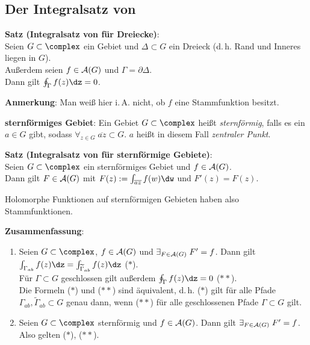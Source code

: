 \subsection{%
    Der Integralsatz von %
}

\textbf{Satz (Integralsatz von  für Dreiecke)}:\\
Seien $G \subset \complex$ ein Gebiet und $\Delta \subset G$ ein Dreieck
(d.\,h. Rand und Inneres liegen in $G$).\\
Außerdem seien $f \in \mathcal{A}(G)$ und $\Gamma = \partial \Delta$.\\
Dann gilt $\oint_\Gamma f(z)\dz = 0$.

\textbf{Anmerkung}:
Man weiß hier i.\,A. nicht, ob $f$ eine Stammfunktion besitzt.

\linie

\textbf{sternförmiges Gebiet}:
Ein Gebiet $G \subset \complex$ heißt \emph{sternförmig}, falls es ein
$a \in G$ gibt, sodass
$\forall_{z \in G}\; \overline{az} \subset G$.
$a$ heißt in diesem Fall \emph{zentraler Punkt}.

\textbf{Satz (Integralsatz von  für sternförmige Gebiete)}:\\
Seien $G \subset \complex$ ein sternförmiges Gebiet und $f \in \mathcal{A}(G)$.\\
Dann gilt $F \in \mathcal{A}(G)$ mit $F(z) := \int_{\overline{az}} f(w)\dw$ und
$F'(z) = F(z)$.

Holomorphe Funktionen auf sternförmigen Gebieten haben also Stammfunktionen.

\linie

\textbf{Zusammenfassung}:
\begin{enumerate}
    \item
    Seien $G \subset \complex$, $f \in \mathcal{A}(G)$ und
    $\exists_{F \in \mathcal{A}(G)}\; F' = f$.
    Dann gilt $\int_{\Gamma_{ab}} f(z)\dz =
    \int_{\widetilde{\Gamma}_{ab}} f(z)\dz$ ($\ast$).\\
    Für $\Gamma \subset G$ geschlossen gilt außerdem $\oint_\Gamma f(z)\dz = 0$
    ($\ast\ast$).\\
    Die Formeln ($\ast$) und ($\ast\ast$) sind äquivalent, d.\,h.
    ($\ast$) gilt für alle Pfade
    $\Gamma_{ab}, \widetilde{\Gamma}_{ab} \subset G$
    genau dann, wenn ($\ast\ast$) für alle geschlossenen Pfade
    $\Gamma \subset G$ gilt.
    
    \item
    Seien $G \subset \complex$ sternförmig und $f \in \mathcal{A}(G)$.
    Dann gilt $\exists_{F \in \mathcal{A}(G)}\; F' = f$.
    Also gelten ($\ast$), ($\ast\ast$).
\end{enumerate}


